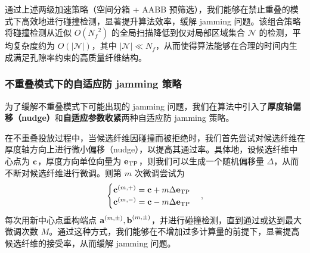 通过上述两级加速策略（空间分箱 + AABB 预筛选），我们能够在禁止重叠的模式下高效地进行碰撞检测，显著提升算法效率，缓解 jamming 问题。该组合策略将碰撞检测从近似 $O({N_f}^2)$ 的全局扫描降低到仅对局部区域集合 $\mathcal{N}$ 的检测，平均复杂度约为 $O(|\mathcal{N}|)$，其中 $|\mathcal{N}| \ll N_f$，从而使得算法能够在合理的时间内生成满足孔隙率约束的高质量纤维结构。

\subsubsection{\textbf{不重叠模式下的自适应防 jamming 策略}}

为了缓解不重叠模式下可能出现的 jamming 问题，我们在算法中引入了\textbf{厚度轴偏移（nudge）}和\textbf{自适应参数收紧}两种自适应防 jamming 策略。

在不重叠投放过程中，当候选纤维因碰撞而被拒绝时，我们首先尝试对候选纤维在厚度轴方向上进行微小偏移（nudge），以提高其通过率。具体地，设候选纤维中心点为 $\textbf c$，厚度方向单位向量为 $\textbf e_{\text{TP}}$，则我们可以生成一个随机偏移量 $\Delta$，从而不断对候选纤维进行微调。则第 $m$ 次微调尝试为
\begin{equation}
\begin{cases}
\textbf c^{(m,+)}= \textbf c + m\Delta\textbf e_{\text{TP}}\\
\textbf c^{(m,-)}= \textbf c - m\Delta\textbf e_{\text{TP}}
\end{cases}
,
\end{equation}
每次用新中心点重构端点 $\textbf a^{(m,\pm)}, \textbf b^{(m,\pm)}$，并进行碰撞检测，直到通过或达到最大微调次数 $M$。通过这种方式，我们能够在不增加过多计算量的前提下，显著提高候选纤维的接受率，从而缓解 jamming 问题。

